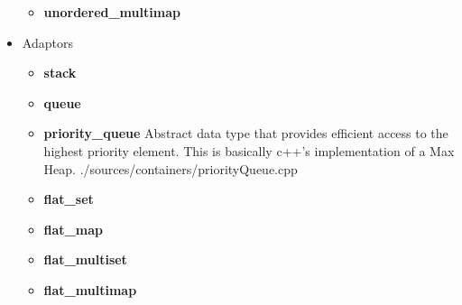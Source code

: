 \documentclass{article}
\begin{document}
\begin{itemize}
\begin{itemize}
          \item \textbf{unordered\_multimap}
        \end{itemize}
      \item Adaptors
        \begin{itemize}
          \item \textbf{stack}
          \item \textbf{queue}
          \item \textbf{priority\_queue} Abstract data type that provides efficient access to the highest priority element. This is basically c++'s implementation of a Max Heap.
             {./sources/containers/priorityQueue.cpp}
          \item \textbf{flat\_set}
          \item \textbf{flat\_map}
          \item \textbf{flat\_multiset}
          \item \textbf{flat\_multimap}
        \end{itemize}
    \end{itemize}
\end{document}
